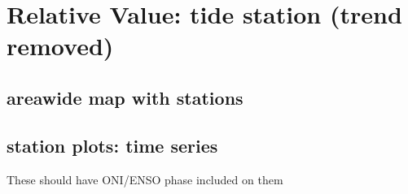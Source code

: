 \documentclass[letterpaper,10pt,english]{jupyterBook}
\begin{document}
\chapter{Relative Value: tide station (trend removed)}
\label{\detokenize{notebooks/regional_and_local/SL_anomaly_intra-annual:relative-value-tide-station-trend-removed}}

\section{area\sphinxhyphen{}wide map with stations}
\label{\detokenize{notebooks/regional_and_local/SL_anomaly_intra-annual:area-wide-map-with-stations}}

\section{station plots: time series}
\label{\detokenize{notebooks/regional_and_local/SL_anomaly_intra-annual:station-plots-time-series}}
\sphinxAtStartPar
These should have ONI/ENSO phase included on them
\end{document}
